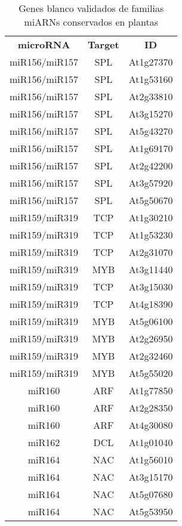 \begin{table}[htbp!]
\tiny
\centering
\caption{Genes blanco validados de familias miARNs conservados en plantas}
\label{table:NAR_table_S3}
\begin{tabular}{ccc}
\textbf{microRNA}      & \textbf{Target}       & \textbf{ID}        \\
miR156/miR157 & SPL          & At1g27370 \\
miR156/miR157 & SPL          & At1g53160 \\
miR156/miR157 & SPL          & At2g33810 \\
miR156/miR157 & SPL          & At3g15270 \\
miR156/miR157 & SPL          & At5g43270 \\
miR156/miR157 & SPL          & At1g69170 \\
miR156/miR157 & SPL          & At2g42200 \\
miR156/miR157 & SPL          & At3g57920 \\
miR156/miR157 & SPL          & At5g50670 \\
miR159/miR319 & TCP          & At1g30210 \\
miR159/miR319 & TCP          & At1g53230 \\
miR159/miR319 & TCP          & At2g31070 \\
miR159/miR319 & MYB          & At3g11440 \\
miR159/miR319 & TCP          & At3g15030 \\
miR159/miR319 & TCP          & At4g18390 \\
miR159/miR319 & MYB          & At5g06100 \\
miR159/miR319 & MYB          & At2g26950 \\
miR159/miR319 & MYB          & At2g32460 \\
miR159/miR319 & MYB          & At5g55020 \\
miR160        & ARF          & At1g77850 \\
miR160        & ARF          & At2g28350 \\
miR160        & ARF          & At4g30080 \\
miR162        & DCL          & At1g01040 \\
miR164        & NAC          & At1g56010 \\
miR164        & NAC          & At3g15170 \\
miR164        & NAC          & At5g07680 \\
miR164        & NAC          & At5g53950 \\

\end{tabular}
\end{table}
